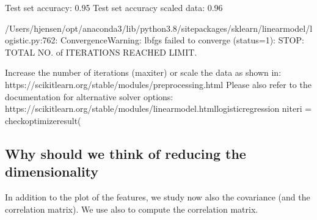 \documentclass[letterpaper,10pt,english]{sphinxmanual}
\begin{document}
\begin{sphinxVerbatim}[commandchars=\\\{\}]
Test set accuracy: 0.95
Test set accuracy scaled data: 0.96
\end{sphinxVerbatim}

\begin{sphinxVerbatim}[commandchars=\\\{\}]
/Users/hjensen/opt/anaconda3/lib/python3.8/site\PYGZhy{}packages/sklearn/linear\PYGZus{}model/\PYGZus{}logistic.py:762: ConvergenceWarning: lbfgs failed to converge (status=1):
STOP: TOTAL NO. of ITERATIONS REACHED LIMIT.

Increase the number of iterations (max\PYGZus{}iter) or scale the data as shown in:
    https://scikit\PYGZhy{}learn.org/stable/modules/preprocessing.html
Please also refer to the documentation for alternative solver options:
    https://scikit\PYGZhy{}learn.org/stable/modules/linear\PYGZus{}model.html\PYGZsh{}logistic\PYGZhy{}regression
  n\PYGZus{}iter\PYGZus{}i = \PYGZus{}check\PYGZus{}optimize\PYGZus{}result(
\end{sphinxVerbatim}


\subsection{Why should we think of reducing the dimensionality}
\label{\detokenize{chapter8:why-should-we-think-of-reducing-the-dimensionality}}
In addition to the plot of the features, we study now also the covariance (and the correlation matrix).
We use also  to compute the correlation matrix.
\end{document}
